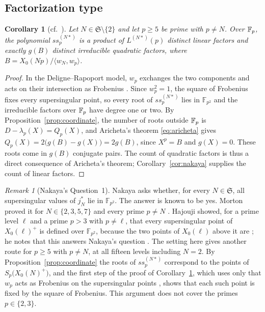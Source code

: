 \documentclass[11pt,a4paper]{article}
\newtheorem{corollary}[theorem]{Corollary}
\theoremstyle{remark}\newtheorem{remark}[theorem]{Remark}
\numberwithin{equation}{section}
\begin{document}
	\subsection{Factorization type}
	\begin{corollary}[cf.\ {\cite[Theorem 3.1]{Aricheta}}]\label{cor:factor}
		Let $N\in\mathfrak S\setminus\{2\}$ and let $p\geq5$ be prime with $p\neq N$. Over $\mathbb F_p$, the polynomial $ss_p^{(N*)}$ is a product of $L^{(N*)}(p)$ distinct linear factors and exactly $g(B)$ distinct irreducible quadratic factors, where $B=X_0(Np)/\langle w_N,w_p\rangle$.
	\end{corollary}
	\begin{proof}
		In the Deligne--Rapoport model, $w_p$ exchanges the two components and acts on their intersection as Frobenius \cite[Proposition 3.8(i)]{Ribet}. Since $w_p^2=1$, the square of Frobenius fixes every supersingular point, so every root of $ss_p^{(N*)}$ lies in $\mathbb F_{p^2}$ and the irreducible factors over $\mathbb F_p$ have degree one or two. By Proposition~\ref{prop:coordinate}, the number of roots outside $\mathbb F_p$ is $D-\lambda_p(X)=Q_p(X)$, and Aricheta's theorem \eqref{eq:aricheta} gives $Q_p(X)=2\bigl(g(B)-g(X)\bigr)=2g(B)$, since $X^p=B$ and $g(X)=0$. These roots come in $g(B)$ conjugate pairs. The count of quadratic factors is thus a direct consequence of Aricheta's theorem; Corollary~\ref{cor:nakaya} supplies the count of linear factors.
	\end{proof}
	
	\begin{remark}[Nakaya's Question~1]
		Nakaya asks \cite[Section~4, Question~1]{Nakaya} whether, for every $N \in \mathfrak S$,
		all supersingular values of $j_N^*$ lie in $\mathbb{F}_{p^2}$. The answer is
		known to be yes. Morton proved it for $N \in \{2,3,5,7\}$ and every prime
		$p \ne N$ \cite[Theorem~6.1]{Morton5a}. Hajouji showed, for a prime level
		$\ell$ and a prime $p>3$ with $p \ne \ell$, that every supersingular point of
		$X_0(\ell)^+$ is defined over $\mathbb{F}_{p^2}$, because the two points of
		$X_0(\ell)$ above it are \cite[Proposition~2.9(1)]{Hajouji}; he notes that this answers Nakaya's question \cite[Section~2.5]{Hajouji}. The setting here
		gives another route for $p \ge 5$ with $p \ne N$, at all fifteen levels
		including $N = 2$. By Proposition~\ref{prop:coordinate} the roots of $ss_p^{(N*)}$ correspond to the points
		of $S_p\bigl(X_0(N)^+\bigr)$, and the first step of the proof of
		Corollary~\ref{cor:factor}, which uses only that $w_p$ acts as Frobenius on the supersingular
		points \cite[Proposition~3.8(i)]{Ribet}, shows that each such point is fixed by
		the square of Frobenius. This argument does not cover the primes $p \in \{2,3\}$.
	\end{remark}
	
\end{document}

